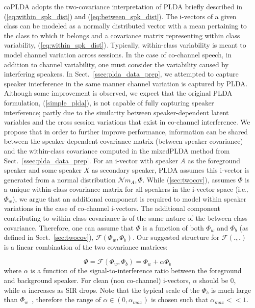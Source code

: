 \documentclass[journal]{IEEEtran}
\begin{document}
caPLDA adopts the two-covariance interpretation of PLDA briefly described in (\ref{eq:within_spk_dist}) and (\ref{eq:between_spk_dist}). 
The i-vectors of a given class can be modeled as a normally distributed vector with a mean pertaining to the class to which it belongs and a covariance matrix representing within class variability, (\ref{eq:within_spk_dist}). 
Typically, within-class variability is meant to model channel variation across sessions. 
In the case of co-channel speech, in addition to channel variability, one must consider the variability caused by interfering speakers. 
In Sect.~\ref{ssec:plda_data_prep}, we attempted to capture speaker interference in the same manner channel variation is captured by PLDA. 
Although some improvement is observed, we expect that the original PLDA formulation, (\ref{simple_plda}), is not capable of fully capturing speaker interference; partly due to the similarity between speaker-dependent latent variables and the cross session variations that exist in co-channel interference. 
We propose that in order to further improve performance, information can be shared between the speaker-dependent covariance matrix (between-speaker covariance) and the within-class covariance computed in the mixedPLDA method from Sect.~\ref{ssec:plda_data_prep}. 
For an i-vector with speaker $A$ as the foreground speaker and some speaker $X$ as secondary speaker, PLDA assumes this i-vector is generated from a normal distribution $\mathcal{N} {m_A,\Phi}$. 
While (\ref{sec:twocov}), assumes $\Phi$ is a unique within-class covariance matrix for all speakers in the i-vector space (i.e., $\Phi_w$), we argue that an additional component is required to model within speaker variations in the case of co-channel i-vectors. 
The additional component contributing to within-class covariance is of the same nature of the between-class covariance. 
Therefore, one can assume that $\Phi$ is a function of both $\Phi_w$ and $\Phi_b$ (as defined in Sect.~\ref{sec:twocov}), $ \mathcal{F} (\Phi_w,\Phi_b)$. 
Our suggested structure for $ \mathcal{F} (.,.)$ is a linear combination of the two covariance matrices: 

\begin{equation}
\Phi = \mathcal{F} (\Phi_w,\Phi_b) = 
\Phi_w + \alpha\Phi_b
\end{equation}
where $\alpha$ is a function of the signal-to-interference ratio between the foreground and background speaker. 
For clean (non co-channel) i-vectors, $\alpha$ should be $0$, while $\alpha$ increases as SIR drops. 
Note that the typical scale of the $\Phi_b$ is much large than $\Phi_w$~\cite{glembek2014wccLDA}, therefore the range of $\alpha \in (0,\alpha_{max})$ is chosen such that $\alpha_{max} << 1$.
\end{document}
